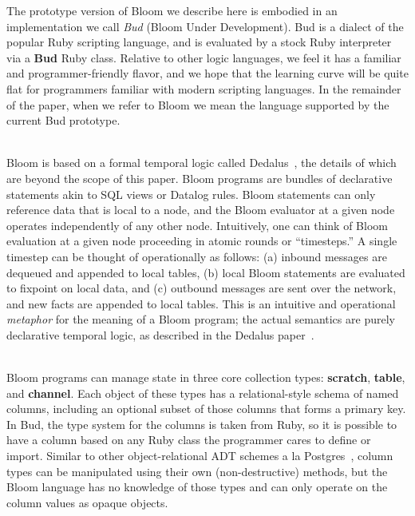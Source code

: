 The prototype version of Bloom we describe here is embodied in an implementation we call {\em Bud} (Bloom Under Development).  Bud is a dialect of the popular Ruby scripting language, and is evaluated by a stock Ruby interpreter via a {\bf Bud} Ruby class.  Relative to other logic languages, we feel it has a familiar and programmer-friendly flavor, and we hope that the learning curve will be quite flat for programmers familiar with modern scripting languages.
In the remainder of the paper, when we refer to Bloom we mean the language supported by the current Bud prototype.

\\
\noindent
Bloom is based on a formal temporal logic called Dedalus~\cite{dedalus-techr}, the details of which are beyond the scope of this paper.  Bloom programs are bundles of declarative statements akin to SQL views or Datalog rules.  Bloom statements can only reference data that is local to a node, and the Bloom evaluator at a given node operates independently of any other node.  Intuitively, one can think of Bloom evaluation at a given node proceeding in atomic rounds or ``timesteps.''   A single timestep can be thought of operationally as follows: (a) inbound messages are dequeued and appended to local tables, (b) local Bloom statements are evaluated to fixpoint on local data, and (c) outbound messages are sent over the network, and new facts are appended to local tables.  This is an intuitive and operational {\em metaphor} for the meaning of a Bloom program; the actual semantics are purely declarative temporal logic, as described in the Dedalus paper~\cite{dedalus-techr}.

\\
\noindent
Bloom programs can manage state in three core collection types: {\bf scratch}, {\bf table}, and {\bf channel}. Each object of these types has a relational-style schema of named columns, including an optional subset of those columns that forms a primary key.  In Bud, the type system for the columns is taken from Ruby, so it is possible to have a column based on any Ruby class the programmer cares to define or import.  Similar to other object-relational ADT schemes a la Postgres~\cite{postgres-adt}, column types can be manipulated using their own (non-destructive) methods, but the Bloom language has no knowledge of those types and can only operate on the column values as opaque objects.  

